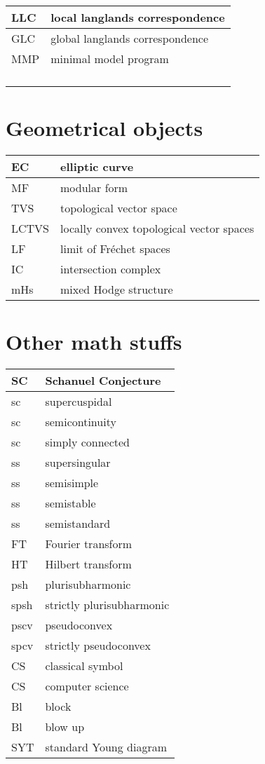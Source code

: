 \documentclass{amsart}
\numberwithin{equation}{section}
\theoremstyle{plain}
\numberwithin{equation}{section}
\theoremstyle{remark}
\begin{document}
\begin{longtable}{l|l}
\hline
LLC & local langlands correspondence \\ \hline
GLC & global langlands correspondence  \\ \hline
MMP & minimal model program\\ \hline
 & \\ \hline
 & \\ \hline
 & \\ \hline
 & \\ \hline
\end{longtable}

\section{Geometrical objects}
\begin{longtable}{l|l}
\hline
EC & elliptic curve \\ \hline
MF & modular form  \\ \hline
TVS & topological vector space\\ \hline
LCTVS &  locally convex topological vector spaces\\ \hline
LF & limit of Fréchet spaces\\ \hline
IC & intersection complex\\ \hline
mHs & mixed Hodge structure\\ \hline
\end{longtable}

\section{Other math stuffs}
\begin{longtable}{l|l}
\hline
SC & Schanuel Conjecture \\ \hline
sc & supercuspidal\\ \hline
sc & semicontinuity\\ \hline
sc & simply connected\\ \hline
ss & supersingular\\ \hline
ss & semisimple\\ \hline
ss & semistable\\ \hline
ss & semistandard\\ \hline
FT & Fourier transform\\ \hline
HT & Hilbert transform\\ \hline
psh & plurisubharmonic\\ \hline
spsh & strictly plurisubharmonic\\ \hline
pscv & pseudoconvex\\ \hline
spcv & strictly pseudoconvex\\ \hline 
CS & classical symbol\\ \hline
CS & computer science\\ \hline
Bl  & block\\ \hline
Bl  & blow up\\ \hline
SYT  & standard Young diagram\\ \hline


\end{longtable}
\end{document}
